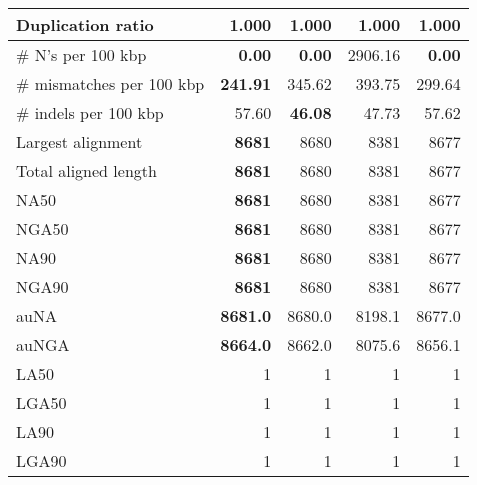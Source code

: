 \documentclass[12pt,a4paper]{article}
\begin{document}
\begin{table}[ht]
\begin{center}
\begin{tabular}{|l*{4}{|r}|}
Duplication ratio & 1.000 & 1.000 & 1.000 & 1.000 \\ \hline
\# N's per 100 kbp & {\bf 0.00} & {\bf 0.00} & 2906.16 & {\bf 0.00} \\ \hline
\# mismatches per 100 kbp & {\bf 241.91} & 345.62 & 393.75 & 299.64 \\ \hline
\# indels per 100 kbp & 57.60 & {\bf 46.08} & 47.73 & 57.62 \\ \hline
Largest alignment & {\bf 8681} & 8680 & 8381 & 8677 \\ \hline
Total aligned length & {\bf 8681} & 8680 & 8381 & 8677 \\ \hline
NA50 & {\bf 8681} & 8680 & 8381 & 8677 \\ \hline
NGA50 & {\bf 8681} & 8680 & 8381 & 8677 \\ \hline
NA90 & {\bf 8681} & 8680 & 8381 & 8677 \\ \hline
NGA90 & {\bf 8681} & 8680 & 8381 & 8677 \\ \hline
auNA & {\bf 8681.0} & 8680.0 & 8198.1 & 8677.0 \\ \hline
auNGA & {\bf 8664.0} & 8662.0 & 8075.6 & 8656.1 \\ \hline
LA50 & 1 & 1 & 1 & 1 \\ \hline
LGA50 & 1 & 1 & 1 & 1 \\ \hline
LA90 & 1 & 1 & 1 & 1 \\ \hline
LGA90 & 1 & 1 & 1 & 1 \\ \hline
\end{tabular}
\end{center}
\end{table}
\end{document}
